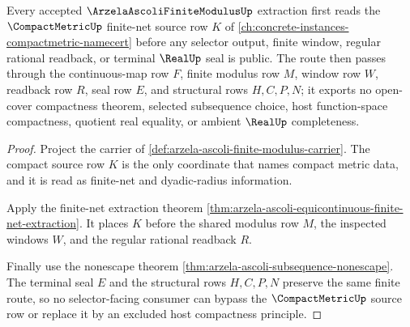 \begin{theorem}
\label{thm:arzela-ascoli-finite-modulus-compactmetric-forward-reference}
Every accepted $\ArzelaAscoliFiniteModulusUp$ extraction first reads the $\CompactMetricUp$ finite-net source row $K$ of \autoref{ch:concrete-instances-compactmetric-namecert} before any selector output, finite window, regular rational readback, or terminal $\RealUp$ seal is public. The route then passes through the continuous-map row $F$, finite modulus row $M$, window row $W$, readback row $R$, seal row $E$, and structural rows $H,C,P,N$; it exports no open-cover compactness theorem, selected subsequence choice, host function-space compactness, quotient real equality, or ambient $\RealUp$ completeness.
\end{theorem}
\begin{proof}
Project the carrier of \autoref{def:arzela-ascoli-finite-modulus-carrier}. The compact source row $K$ is the only coordinate that names compact metric data, and it is read as finite-net and dyadic-radius information.

Apply the finite-net extraction theorem \autoref{thm:arzela-ascoli-equicontinuous-finite-net-extraction}. It places $K$ before the shared modulus row $M$, the inspected windows $W$, and the regular rational readback $R$.

Finally use the nonescape theorem \autoref{thm:arzela-ascoli-subsequence-nonescape}. The terminal seal $E$ and the structural rows $H,C,P,N$ preserve the same finite route, so no selector-facing consumer can bypass the $\CompactMetricUp$ source row or replace it by an excluded host compactness principle.
\end{proof}
